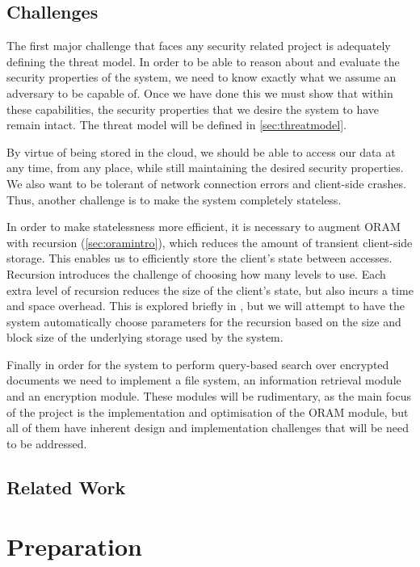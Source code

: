 \documentclass[12pt,a4paper,twoside,openright]{report}
\newcommand{\mytodo}{\todo[inline, color=green!40]}
\begin{document}
\section{Challenges}

The first major challenge that faces any security related project is adequately defining the threat model. In order to be able to reason about and evaluate the security properties of the system, we need to know exactly what we assume an adversary to be capable of. Once we have done this we must show that within these capabilities, the security properties that we desire the system to have remain intact. The threat model will be defined in \cref{sec:threatmodel}.

By virtue of being stored in the cloud, we should be able to access our data at any time, from any place, while still maintaining the desired security properties. We also want to be tolerant of network connection errors and client-side crashes. Thus, another challenge is to make the system completely stateless.

In order to make statelessness more efficient, it is necessary to augment ORAM with recursion (\cref{sec:oramintro}), which reduces the amount of transient client-side storage. This enables us to efficiently store the client's state between accesses. Recursion introduces the challenge of choosing how many levels to use. Each extra level of recursion reduces the size of the client's state, but also incurs a time and space overhead. This is explored briefly in \cite{stefanov2013path}, but we will attempt to have the system automatically choose parameters for the recursion based on the size and block size of the underlying storage used by the system.

Finally in order for the system to perform query-based search over encrypted documents we need to implement a file system, an information retrieval module and an encryption module. These modules will be rudimentary, as the main focus of the project is the implementation and optimisation of the ORAM module, but all of them have inherent design and implementation challenges that will be need to be addressed.

\section{Related Work}

\mytodo{Explore and discuss related work}

\chapter{Preparation}
\end{document}
